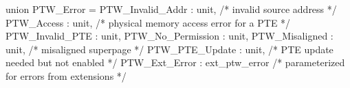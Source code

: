 union PTW_Error = {
  PTW_Invalid_Addr  : unit,          /* invalid source address */
  PTW_Access        : unit,          /* physical memory access error for a PTE */
  PTW_Invalid_PTE   : unit,
  PTW_No_Permission : unit,
  PTW_Misaligned    : unit,          /* misaligned superpage */
  PTW_PTE_Update    : unit,          /* PTE update needed but not enabled */
  PTW_Ext_Error     : ext_ptw_error  /* parameterized for errors from extensions */
}
